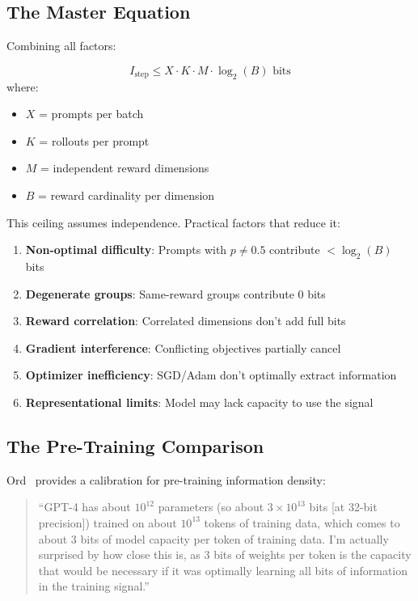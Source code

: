 \documentclass[11pt,a4paper]{article}
\theoremstyle{definition}
\theoremstyle{remark}
\begin{document}
\subsection{The Master Equation}

Combining all factors:

\begin{keyresult}
\[
\boxed{I_{\text{step}} \leq X \cdot K \cdot M \cdot \log_2(B) \text{ bits}}
\]
where:
\begin{itemize}
    \item $X$ = prompts per batch
    \item $K$ = rollouts per prompt
    \item $M$ = independent reward dimensions
    \item $B$ = reward cardinality per dimension
\end{itemize}
\end{keyresult}

This ceiling assumes independence. Practical factors that reduce it:
\begin{enumerate}
    \item \textbf{Non-optimal difficulty}: Prompts with $p \neq 0.5$ contribute $< \log_2(B)$ bits
    \item \textbf{Degenerate groups}: Same-reward groups contribute 0 bits
    \item \textbf{Reward correlation}: Correlated dimensions don't add full bits
    \item \textbf{Gradient interference}: Conflicting objectives partially cancel
    \item \textbf{Optimizer inefficiency}: SGD/Adam don't optimally extract information
    \item \textbf{Representational limits}: Model may lack capacity to use the signal
\end{enumerate}

\subsection{The Pre-Training Comparison}

Ord~\cite{ord2025} provides a calibration for pre-training information density:

\begin{quote}
``GPT-4 has about $10^{12}$ parameters (so about $3 \times 10^{13}$ bits [at 32-bit precision]) trained on about $10^{13}$ tokens of training data, which comes to about 3 bits of model capacity per token of training data. I'm actually surprised by how close this is, as 3 bits of weights per token is the capacity that would be necessary if it was optimally learning all bits of information in the training signal.''
\end{quote}
\end{document}
